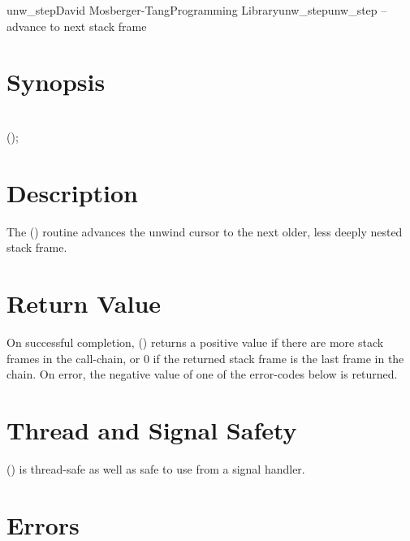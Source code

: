 \documentclass{article}
\begin{document}
\begin{Name}{3}{unw\_step}{David Mosberger-Tang}{Programming Library}{unw\_step}unw\_step -- advance to next stack frame
\end{Name}

\section{Synopsis}

\\

 ();\\

\section{Description}

The () routine advances the unwind cursor  to
the next older, less deeply nested stack frame.

\section{Return Value}

On successful completion, () returns a positive value
if there are more stack frames in the call-chain, or 0 if the returned
stack frame is the last frame in the chain.  On error, the negative
value of one of the error-codes below is returned.

\section{Thread and Signal Safety}

() is thread-safe as well as safe to use
from a signal handler.

\section{Errors}
\end{document}
